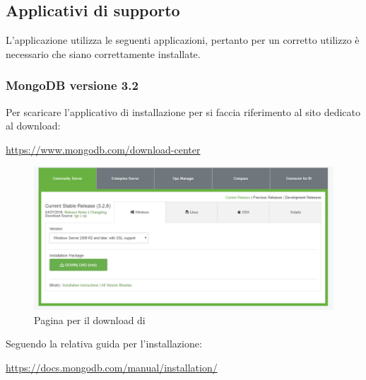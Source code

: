 \documentclass[12pt,a4paper]{article}
\begin{document}
	\subsection{Applicativi di supporto}
	L'applicazione \prj{} utilizza le seguenti applicazioni, pertanto per un corretto utilizzo è necessario che siano correttamente installate.
	\subsubsection{MongoDB versione 3.2}
	Per scaricare l'applicativo di installazione per  si faccia riferimento al sito dedicato al download:
	\begin{center} \url{https://www.mongodb.com/download-center}
	\end{center}
	
	\begin{figure}[H]	
		\centering
		\includegraphics[width=1.0\linewidth]{../img/manualeInstallazione/mongoDownloadCenter.png}
		\caption{Pagina per il download di }
		\label{Pagina per il download di MongoDB}
	\end{figure}
	
	Seguendo la relativa guida per l'installazione:
		\begin{center} \url{https://docs.mongodb.com/manual/installation/}
		\end{center}
	
\end{document}
